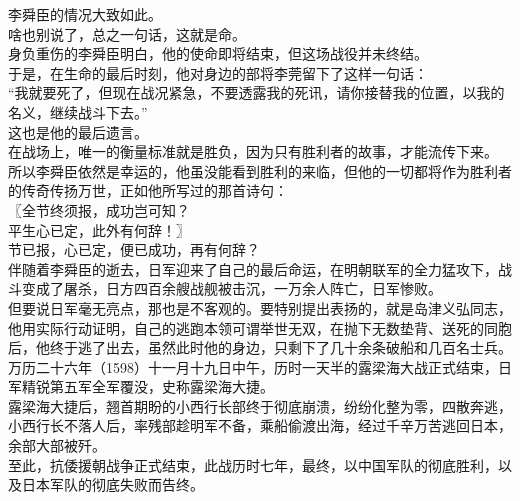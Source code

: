 \begin{multicols}{\theparacolNo}
李舜臣的情况大致如此。\\

啥也别说了，总之一句话，这就是命。\\

身负重伤的李舜臣明白，他的使命即将结束，但这场战役并未终结。\\

于是，在生命的最后时刻，他对身边的部将李莞留下了这样一句话：\\

“我就要死了，但现在战况紧急，不要透露我的死讯，请你接替我的位置，以我的名义，继续战斗下去。”\\

这也是他的最后遗言。\\

在战场上，唯一的衡量标准就是胜负，因为只有胜利者的故事，才能流传下来。\\

所以李舜臣依然是幸运的，他虽没能看到胜利的来临，但他的一切都将作为胜利者的传奇传扬万世，正如他所写过的那首诗句：\\

〖全节终须报，成功岂可知？\\

平生心已定，此外有何辞！〗\\

节已报，心已定，便已成功，再有何辞？\\

伴随着李舜臣的逝去，日军迎来了自己的最后命运，在明朝联军的全力猛攻下，战斗变成了屠杀，日方四百余艘战舰被击沉，一万余人阵亡，日军惨败。\\

但要说日军毫无亮点，那也是不客观的。要特别提出表扬的，就是岛津义弘同志，他用实际行动证明，自己的逃跑本领可谓举世无双，在抛下无数垫背、送死的同胞后，他终于逃了出去，虽然此时他的身边，只剩下了几十余条破船和几百名士兵。\\

万历二十六年（1598）十一月十九日中午，历时一天半的露梁海大战正式结束，日军精锐第五军全军覆没，史称露梁海大捷。\\

露梁海大捷后，翘首期盼的小西行长部终于彻底崩溃，纷纷化整为零，四散奔逃，小西行长不落人后，率残部趁明军不备，乘船偷渡出海，经过千辛万苦逃回日本，余部大部被歼。\\

至此，抗倭援朝战争正式结束，此战历时七年，最终，以中国军队的彻底胜利，以及日本军队的彻底失败而告终。\\


\end{multicols}
